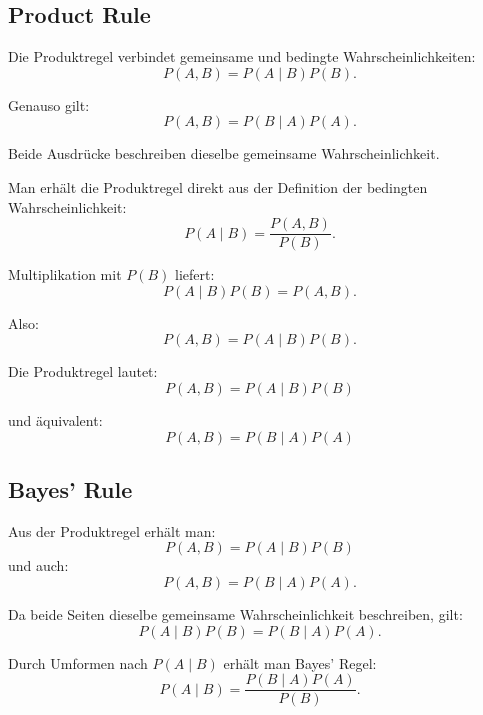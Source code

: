 \documentclass[11pt,a4paper]{scrartcl}
\begin{document}
\subsection{Product Rule}

\begin{calculationbox}
    Die Produktregel verbindet gemeinsame und bedingte Wahrscheinlichkeiten:
    \[
        P(A,B) = P(A \mid B)P(B).
    \]

    Genauso gilt:
    \[
        P(A,B) = P(B \mid A)P(A).
    \]

    Beide Ausdrücke beschreiben dieselbe gemeinsame Wahrscheinlichkeit.
\end{calculationbox}

\begin{sidecalcbox}
    Man erhält die Produktregel direkt aus der Definition der bedingten
    Wahrscheinlichkeit:
    \[
        P(A \mid B)
        =
        \frac{P(A,B)}{P(B)}.
    \]

    Multiplikation mit \(P(B)\) liefert:
    \[
        P(A \mid B)P(B)
        =
        P(A,B).
    \]

    Also:
    \[
        P(A,B)
        =
        P(A \mid B)P(B).
    \]
\end{sidecalcbox}

\begin{answerbox}
    Die Produktregel lautet:
    \[
        \boxed{
            P(A,B) = P(A \mid B)P(B)
        }
    \]

    und äquivalent:
    \[
        \boxed{
            P(A,B) = P(B \mid A)P(A)
        }
    \]
\end{answerbox}

\subsection{Bayes' Rule}

\begin{calculationbox}
    Aus der Produktregel erhält man:
    \[
        P(A,B) = P(A \mid B)P(B)
    \]
    und auch:
    \[
        P(A,B) = P(B \mid A)P(A).
    \]

    Da beide Seiten dieselbe gemeinsame Wahrscheinlichkeit beschreiben, gilt:
    \[
        P(A \mid B)P(B) = P(B \mid A)P(A).
    \]

    Durch Umformen nach \(P(A \mid B)\) erhält man Bayes' Regel:
    \[
        P(A \mid B)
        =
        \frac{P(B \mid A)P(A)}{P(B)}.
    \]
\end{calculationbox}
\end{document}
